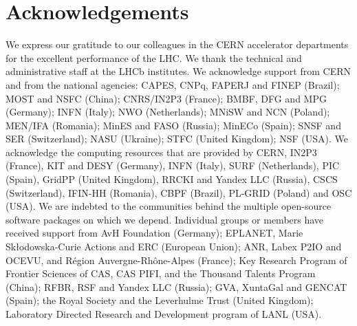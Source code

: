 \section*{Acknowledgements}
%
%
\noindent We express our gratitude to our colleagues in the CERN
accelerator departments for the excellent performance of the LHC. We
thank the technical and administrative staff at the LHCb
institutes.
We acknowledge support from CERN and from the national agencies:
CAPES, CNPq, FAPERJ and FINEP (Brazil); 
MOST and NSFC (China); 
CNRS/IN2P3 (France); 
BMBF, DFG and MPG (Germany); 
INFN (Italy); 
NWO (Netherlands); 
MNiSW and NCN (Poland); 
MEN/IFA (Romania); 
MinES and FASO (Russia); 
MinECo (Spain); 
SNSF and SER (Switzerland); 
NASU (Ukraine); 
STFC (United Kingdom); 
NSF (USA).
We acknowledge the computing resources that are provided by CERN, IN2P3
(France), KIT and DESY (Germany), INFN (Italy), SURF (Netherlands),
PIC (Spain), GridPP (United Kingdom), RRCKI and Yandex
LLC (Russia), CSCS (Switzerland), IFIN-HH (Romania), CBPF (Brazil),
PL-GRID (Poland) and OSC (USA).
We are indebted to the communities behind the multiple open-source
software packages on which we depend.
Individual groups or members have received support from
AvH Foundation (Germany);
EPLANET, Marie Sk\l{}odowska-Curie Actions and ERC (European Union);
ANR, Labex P2IO and OCEVU, and R\'{e}gion Auvergne-Rh\^{o}ne-Alpes (France);
Key Research Program of Frontier Sciences of CAS, CAS PIFI, and the Thousand Talents Program (China);
RFBR, RSF and Yandex LLC (Russia);
GVA, XuntaGal and GENCAT (Spain);
the Royal Society
and the Leverhulme Trust (United Kingdom);
Laboratory Directed Research and Development program of LANL (USA).
